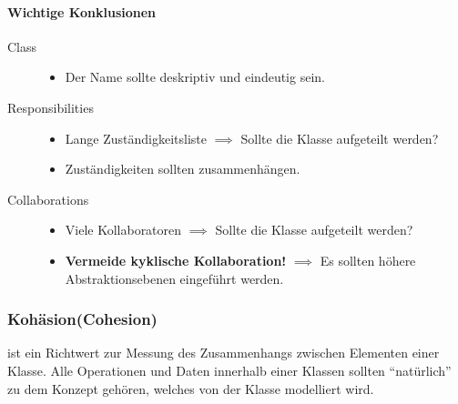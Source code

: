 \documentclass[
    ngerman,
    color=3b,
    summary,
    boxarc,
    main,
]{rubos-tuda-template}
\begin{document}

\paragraph{Wichtige Konklusionen}\mbox{}\par
\begin{description}
    \item[Class]
          \begin{itemize}
              \item Der Name sollte deskriptiv und eindeutig sein.
          \end{itemize}
    \item[Responsibilities]
          \begin{itemize}
              \item Lange Zuständigkeitsliste  $ \implies $ Sollte die Klasse aufgeteilt werden?
              \item Zuständigkeiten sollten zusammenhängen.
          \end{itemize}
    \item[Collaborations]
          \begin{itemize}
              \item Viele Kollaboratoren $ \implies $ Sollte die Klasse aufgeteilt werden?
              \item \textbf{Vermeide kyklische Kollaboration!} $ \implies $ Es sollten höhere Abstraktionsebenen eingeführt werden.
          \end{itemize}
\end{description}

\subsubsection{Kohäsion(Cohesion)}
\begin{definition}[Kohäsion]
    ist ein Richtwert zur Messung des Zusammenhangs zwischen Elementen einer Klasse. Alle Operationen und Daten innerhalb einer Klassen sollten \enquote{natürlich} zu dem Konzept gehören, welches von der Klasse modelliert wird.
\end{definition}
\end{document}
